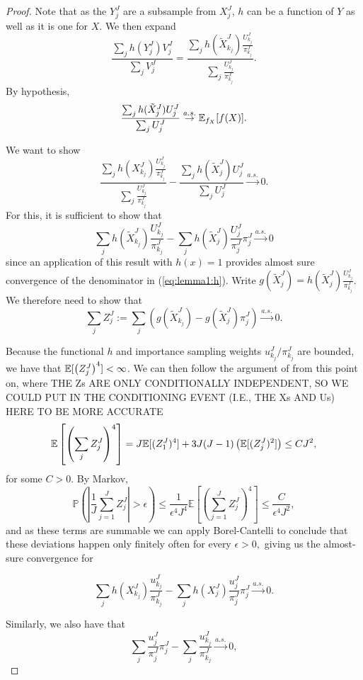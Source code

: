 \begin{proof}


    Note that as the $Y_j^J$ are a subsample from $X_j^J$, $h$ can be a function of $Y$ as well as it is one for $X$. We then expand
    $$\frac{\sum_j h(Y_j^J) V_j^J}{\sum_j V_j^J} = \frac{\sum_j h(\tilde X_{k_j}^J)\frac{U_{k_j}^J}{\pi_{k_j}^J}}{\sum_j \frac{U_{k_j}^J}{\pi_{k_j}^J}}.$$
    By hypothesis,
    $$\frac{\sum_j h(\tilde X_j^J)U_j^J}{\sum_j U_j^J} \stackrel{a.s.}{\to} \mathbb{E}_{f_X}[f(X)].$$

    We want to show
    \begin{equation}\label{eq:lemma1:h}
    \frac{\sum_j h(X_{k_j}^J)\frac{U_{k_j}^J}{\pi_{k_j}^J}}{\sum_j \frac{U_{k_j}^J}{\pi_{k_j}^J}} - \frac{\sum_j h(\tilde X_j^J)U_j^J}{\sum_j U_j^J} \stackrel{a.s.}{\to} 0.
    \end{equation}
    For this, it is sufficient to show that
   $$ \sum_j h(\tilde X_{k_j}^J)\frac{U_{k_j}^J}{\pi_{k_j}^J}
    -  \sum_j h(\tilde X_j^J)\frac{U_j^J}{\pi_j^J}\pi_j^J \stackrel{a.s.}{\to} 0 $$
    since an application of this result with $h(x)=1$ provides almost sure convergence of the denominator in (\ref{eq:lemma1:h}).
    Write $g(\tilde X_j^J) = h(\tilde X_j^J)\frac{U_{k_j}^J}{\pi_{k_j}^J}$. We therefore need to show that 
    $$\sum_j Z_j^J := \sum_j \left(g(\tilde X_{k_j}^J) -  g(\tilde X_j^J) \pi_j^J \right) \stackrel{a.s.}{\to} 0.$$

    Because the functional $h$ and importance sampling weights $u_{k_j}^J/\pi_{k_j}^J$ are bounded, we have that $\mathbb{E}[\left(Z_j^J\right)^4] < \infty$. We can then follow the argument of \cite{chopin20} from this point on, where 
    {THE Zs ARE ONLY CONDITIONALLY INDEPENDENT, SO WE COULD PUT IN THE CONDITIONING EVENT (I.E., THE Xs AND Us) HERE TO BE MORE ACCURATE}
    $$\mathbb{E}\left[\left(\sum_j Z_j^J\right)^4\right] 
    = J\mathbb{E}[(Z_1^J)^4] + 3J(J-1)\left(\mathbb{E}[(Z_j^J)^2]\right) \leq CJ^2,$$ for some $C>0$. By Markov, 
    $$\mathbb{P}\left(\left|\frac{1}{J} \sum_{j=1}^J Z_j^J\right|>\epsilon\right) 
    \leq \frac{1}{\epsilon^4J^4 } 
    \mathbb{E}\left[\left(\sum_{j=1}^J Z_j^J\right)^4\right] \leq \frac{C}{\epsilon^4J^2},$$
    and as these terms are summable we can apply Borel-Cantelli to conclude that these deviations happen only finitely often for every $\epsilon>0,$ giving us the almost-sure convergence for
    
    $$ \sum_j h(X_{k_j}^J)\frac{u_{k_j}^J}{\pi_{k_j}^J}
    -  \sum_j h(X_j^J)\frac{u_j^J}{\pi_j^J}\pi_j^J \stackrel{a.s.}{\to} 0.$$ 

    Similarly, we also have that
    $$ \sum_j \frac{u_j^J}{\pi_j^J}\pi_j^J
    - \sum_j \frac{u_{k_j}^J}{\pi_{k_j}^J} \stackrel{a.s.}{\to} 0,$$


\end{proof}
